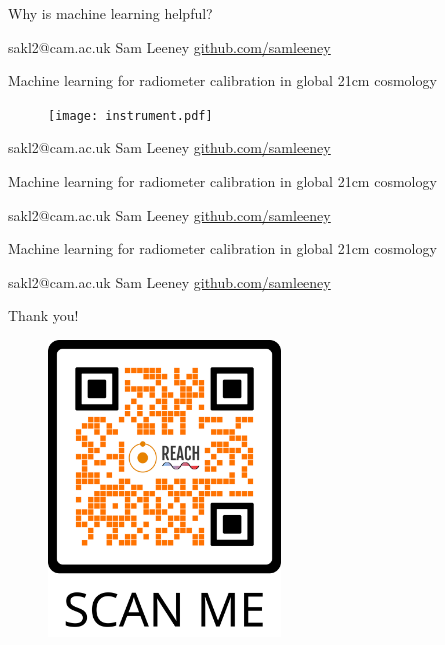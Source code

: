 \documentclass{beamer}
\begin{document}
\begin{frame}{\small{Why is machine learning helpful?}}
\begin{figure}[h]
  \centering
  
\end{figure}
\vfill
\tiny{sakl2@cam.ac.uk \hfill Sam Leeney \hfill \href{https://github.com/samleeney}{github.com/samleeney}}
\end{frame}

\begin{frame}{\small{Machine learning for radiometer calibration in global 21cm cosmology}}
  \begin{figure}
    \centering
    \texttt{[image: instrument.pdf]}
  \end{figure}
\vfill
\tiny{sakl2@cam.ac.uk \hfill Sam Leeney \hfill \href{https://github.com/samleeney}{github.com/samleeney}}
\end{frame}

\begin{frame}{\small{Machine learning for radiometer calibration in global 21cm cosmology}}
  \begin{figure}
    \centering
    
  \end{figure}
\vfill
\tiny{sakl2@cam.ac.uk \hfill Sam Leeney \hfill \href{https://github.com/samleeney}{github.com/samleeney}}
\end{frame}

\begin{frame}{\small{Machine learning for radiometer calibration in global 21cm cosmology}}
  \begin{figure}
    \centering
    
  \end{figure}

  \begin{figure}
    \centering
    
  \end{figure}
\vfill
\tiny{sakl2@cam.ac.uk \hfill Sam Leeney \hfill \href{https://github.com/samleeney}{github.com/samleeney}}
\end{frame}

\begin{frame}{\small{Thank you!}}
  \begin{figure}
    \centering
    \includegraphics[width=0.55\textwidth]{qr.png}
  \end{figure}
\end{frame}
\end{document}
